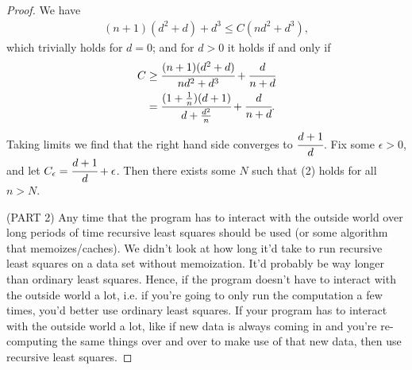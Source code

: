 \documentclass[12pt]{article}
\begin{document}
\begin{proof}
We have
\begin{align}
  (n+1)(d^2 + d) + d^3 \leq C(nd^2 + d^3),
\end{align}
which trivially holds for $d=0$; and for $d > 0$ it holds if and only if 
\begin{align*}
  C &\geq \cfrac{(n+1)(d^2+d)}{nd^2+d^3} + \cfrac{d}{n+d} \\
  &= \cfrac{(1+\frac{1}{n})(d+1)}{d+\frac{d^2}{n}} + \cfrac{d}{n+d}.
\end{align*}
Taking limits we find that the right hand side converges to $\cfrac{d+1}{d}$. Fix some $\epsilon>0$, and let $C_{\epsilon} = \cfrac{d+1}{d} + \epsilon$. Then there exists some $N$ such that (2) holds for all $n>N$. \bigbreak

(PART 2) Any time that the program has to interact with the outside world over long periods of time recursive least squares should be used (or some algorithm that memoizes/caches). We didn't look at how long it'd take to run recursive least squares on a data set without memoization. It'd probably be way longer than ordinary least squares. Hence, if the program doesn't have to interact with the outside world a lot, i.e. if you're going to only run the computation a few times, you'd better use ordinary least squares. If your program has to interact with the outside world a lot, like if new data is always coming in and you're re-computing the same things over and over to make use of that new data, then use recursive least squares.

\end{proof}
\end{document}
